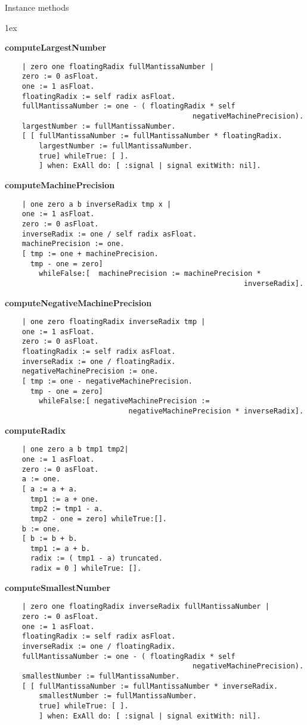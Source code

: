 Instance methods
{\parskip 1ex\par\noindent}
{\bf computeLargestNumber}
\begin{verbatim}
    | zero one floatingRadix fullMantissaNumber |
    zero := 0 asFloat.
    one := 1 asFloat.
    floatingRadix := self radix asFloat.
    fullMantissaNumber := one - ( floatingRadix * self 
                                            negativeMachinePrecision).
    largestNumber := fullMantissaNumber.
    [ [ fullMantissaNumber := fullMantissaNumber * floatingRadix.
        largestNumber := fullMantissaNumber.
        true] whileTrue: [ ].
        ] when: ExAll do: [ :signal | signal exitWith: nil].

\end{verbatim}
{\bf computeMachinePrecision}
\begin{verbatim}
    | one zero a b inverseRadix tmp x |
    one := 1 asFloat.
    zero := 0 asFloat.
    inverseRadix := one / self radix asFloat.
    machinePrecision := one.
    [ tmp := one + machinePrecision.
      tmp - one = zero]
        whileFalse:[  machinePrecision := machinePrecision * 
                                                        inverseRadix].

\end{verbatim}
{\bf computeNegativeMachinePrecision}
\begin{verbatim}
    | one zero floatingRadix inverseRadix tmp |
    one := 1 asFloat.
    zero := 0 asFloat.
    floatingRadix := self radix asFloat.
    inverseRadix := one / floatingRadix.
    negativeMachinePrecision := one.
    [ tmp := one - negativeMachinePrecision.
      tmp - one = zero]
        whileFalse:[ negativeMachinePrecision := 
                             negativeMachinePrecision * inverseRadix].

\end{verbatim}
{\bf computeRadix}
\begin{verbatim}
    | one zero a b tmp1 tmp2|
    one := 1 asFloat.
    zero := 0 asFloat.
    a := one.
    [ a := a + a.
      tmp1 := a + one.
      tmp2 := tmp1 - a.
      tmp2 - one = zero] whileTrue:[].
    b := one.
    [ b := b + b.
      tmp1 := a + b.
      radix := ( tmp1 - a) truncated.
      radix = 0 ] whileTrue: [].

\end{verbatim}
{\bf computeSmallestNumber}
\begin{verbatim}
    | zero one floatingRadix inverseRadix fullMantissaNumber |
    zero := 0 asFloat.
    one := 1 asFloat.
    floatingRadix := self radix asFloat.
    inverseRadix := one / floatingRadix.
    fullMantissaNumber := one - ( floatingRadix * self 
                                            negativeMachinePrecision).
    smallestNumber := fullMantissaNumber.
    [ [ fullMantissaNumber := fullMantissaNumber * inverseRadix.
        smallestNumber := fullMantissaNumber.
        true] whileTrue: [ ].
        ] when: ExAll do: [ :signal | signal exitWith: nil].

\end{verbatim}
